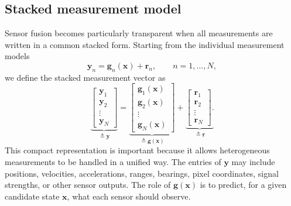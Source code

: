 \subsection{Stacked measurement model}
Sensor fusion becomes particularly transparent when all measurements are written in a common stacked form. Starting from the individual measurement models
\begin{equation}
\mathbf{y}_n
=
\mathbf{g}_n(\mathbf{x})
+
\mathbf{r}_n,
\qquad n=1,\ldots,N,
\end{equation}
we define the stacked measurement vector as
\begin{equation}
\underbrace{\begin{bmatrix}
\mathbf{y}_1\\
\mathbf{y}_2\\
\vdots\\
\mathbf{y}_N
\end{bmatrix}}_{\triangleq \mathbf{y}} = 
\underbrace{\begin{bmatrix}
\mathbf{g}_1(\mathbf{x})\\
\mathbf{g}_2(\mathbf{x})\\
\vdots\\
\mathbf{g}_N(\mathbf{x})
\end{bmatrix}}_{\triangleq \mathbf{g}(\mathbf{x})} + 
\underbrace{\begin{bmatrix}
\mathbf{r}_1\\
\mathbf{r}_2\\
\vdots\\
\mathbf{r}_N
\end{bmatrix}.}_{\triangleq \mathbf{r}}
\end{equation}
This compact representation is important because it allows heterogeneous measurements to be handled in a unified way. The entries of $\mathbf{y}$ may include positions, velocities, accelerations, ranges, bearings, pixel coordinates, signal strengths, or other sensor outputs. The role of $\mathbf{g}(\mathbf{x})$ is to predict, for a given candidate state $\mathbf{x}$, what each sensor should observe.

